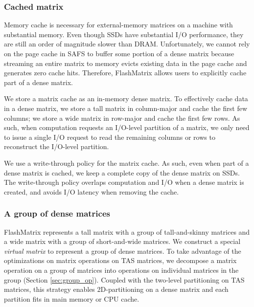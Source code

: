 \subsubsection{Cached matrix}
Memory cache is necessary for external-memory matrices on a machine with
substantial memory.
Even though SSDs have substantial I/O performance, they are still
an order of magnitude slower than DRAM. Unfortunately, we cannot rely on
the page cache in SAFS \cite{SA-cache} to buffer some portion of a dense matrix
because streaming an entire matrix to memory evicts existing data in the page
cache and generates zero cache hits. Therefore, FlashMatrix allows users to
explicitly cache part of a dense matrix.

We store a matrix cache as an in-memory dense matrix.
To effectively cache data in a dense matrix, we store a tall matrix in
column-major and cache the first few columns; we store a wide matrix in row-major
and cache the first few rows. As such, when computation requests an I/O-level
partition of a matrix, we only need to issue a single I/O request to read
the remaining columns or rows to reconstruct the I/O-level partition.

We use a write-through policy for the matrix cache. As such, even when part of
a dense matrix is cached, we keep a complete copy of the dense matrix on SSDs.
The write-through policy overlaps computation and I/O when
a dense matrix is created, and avoids I/O latency when removing the cache.

\subsubsection{A group of dense matrices} \label{sec:mat_group}
FlashMatrix represents a tall matrix with a group of
tall-and-skinny matrices and a wide matrix with a group of short-and-wide
matrices. We construct a special \textit{virtual matrix} to represent
a group of dense matrices. To take advantage of the optimizations on matrix
operations on TAS matrices, we decompose a matrix operation on a group of
matrices into operations on individual matrices in the group (Section
\ref{sec:group_op}).
Coupled with the two-level partitioning on TAS matrices, this strategy enables
2D-partitioning on a dense matrix and each partition fits in main memory
or CPU cache.




